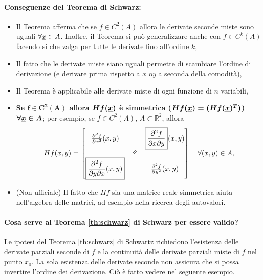 \paragraph{Conseguenze del Teorema di Schwarz:}
\begin{itemize}
	\item Il Teorema afferma che se $f\in C^2(A)$ allora le derivate seconde miste sono uguali $\forall \uline x\in A$. Inoltre, il Teorema si può generalizzare anche con $f\in C^k(A)$ facendo si che valga per tutte le derivate fino all'ordine $k$,
	\item Il fatto che le derivate miste siano uguali permette di scambiare l'ordine di derivazione (e derivare prima rispetto a $x$ o$y$ a seconda della comodità),
	\item Il Teorema è applicabile alle derivate miste di ogni funzione di $n$ variabili,
	\item \textbf{Se $\boldsymbol{f\in C^2(A)}$ allora $\boldsymbol{Hf(\uline x)}$ è simmetrica ($\boldsymbol{Hf(\uline x)=(Hf(\uline x)^T)}$) $\boldsymbol{\forall\uline x\in A}$}; per esempio, se $f\in C^2(A),\, A\subset \mathbb{R}^2$, allora
	\begin{equation*}
		Hf(x,y) =
		\begin{bmatrix}
			\frac{\partial^2 f}{\partial x^2}(x,y) & &	\boxed{\frac{\partial ^2 f}{\partial x\partial y}}(x,y)\\
			&\horeq&\\
			\boxed{\frac{\partial ^2 f}{\partial y\partial x}(x,y)}&& \frac{\partial^2 f}{\partial y^2}(x,y)
		\end{bmatrix}\quad \forall(x,y)\in A,
	\end{equation*}
	\item (Non ufficiale) Il fatto che $Hf$ sia una matrice reale simmetrica aiuta nell'algebra delle matrici, ad esempio nella ricerca degli autovalori.
\end{itemize}

\paragraph{Cosa serve al Teorema \ref{th:schwarz} di Schwarz per essere valido?} Le ipotesi del Teorema \ref{th:schwarz} di Schwartz richiedono l'esistenza delle derivate parziali seconde di $f$ e la continuità delle derivate parziali miste di $f$ nel punto $x_0$. La sola esistenza delle derivate seconde non assicura che si possa invertire l'ordine dei derivazione. Ciò è fatto vedere nel seguente esempio.


